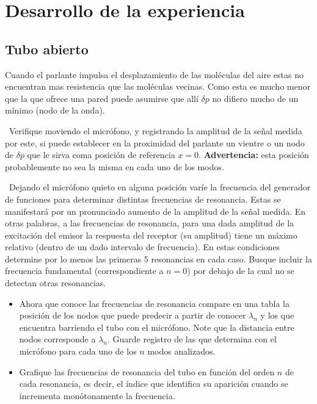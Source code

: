 \documentclass[laboratorio]{guia}
\begin{document}
\section{Desarrollo de la experiencia}

\subsection{Tubo abierto}
Cuando el parlante impulsa el desplazamiento de las moléculas del aire estas no encuentran mas resistencia que las moléculas vecinas.
Como esta es mucho menor que la que ofrece una pared puede asumirse que allí \(\delta p\) no difiero mucho de un mínimo (nodo de la onda).

\textbullet\ 
Verifique moviendo el micrófono, y registrando la amplitud de la señal medida por este, si puede establecer en la proximidad del parlante un vientre o un nodo de \(\delta p\) que le sirva coma posición de referencia \(x=0\).
\textbf{Advertencia:} esta posición probablemente no sea la misma en cada uno de los modos.

\textbullet\ Dejando el micrófono quieto en alguna posición varíe la frecuencia del generador de funciones para determinar distintas frecuencias de resonancia.
Estas se manifestará por un pronunciado aumento de la amplitud de la señal medida.
En otras palabras, a las frecuencias de resonancia, para una dada amplitud de la excitación del emisor la respuesta del receptor (su amplitud) tiene un máximo relativo (dentro de un dado intervalo de frecuencia).
En estas condiciones determine por lo menos las primeras 5 resonancias en cada caso.
  Busque incluir la frecuencia fundamental (correspondiente a \(n=0\)) por debajo de la cual no se detectan otras resonancias.

\begin{itemize}
 \item Ahora que conoce las frecuencias de resonancia compare en una tabla la posición de los nodos que puede predecir a partir de conocer \(\lambda_n\) y los que encuentra barriendo el tubo con el micrófono.
  Note que la distancia entre nodos corresponde a \(\lambda_n\).
	Guarde registro de las que determina con el micrófono para cada uno de los \(n\) modos analizados.
    \item Grafique las frecuencias de resonancia del tubo en función del orden \(n\) de cada resonancia, es decir, el índice que identifica su aparición cuando se incrementa monótonamente la frecuencia.
\end{itemize}
\end{document}
